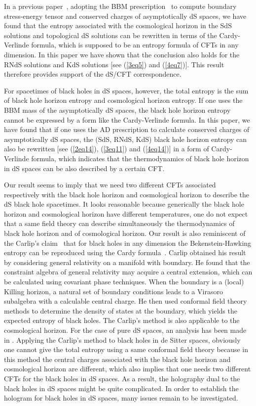 \documentclass[a4paper,12pt]{article}
\begin{document}
In a previous paper~\cite{Cai1}, adopting the BBM prescription~\cite{BBM} to compute 
boundary stress-energy tensor and conserved charges of asymptotically dS spaces, we have found
that the entropy associated with the cosmological horizon in the SdS solutions and topological 
dS solutions can be rewritten in terms of the Cardy-Verlinde formula, which is supposed
 to be an entropy formula of CFTs in any dimension. In this paper we have shown that
the conclusion also holds for the RNdS solutions and KdS solutions [see (\ref{3eq5}) and
(\ref{4eq7})].  This result therefore provides support of the dS/CFT correspondence.   

For spacetimes of black holes in dS spaces, however, the total entropy is the sum of black
hole horizon entropy and cosmological horizon entropy. If one uses the BBM mass of
the asymptotically dS spaces, the black hole horizon entropy cannot be expressed by a form
like the Cardy-Verlinde formula.  In this paper, we have found that if one uses the AD
prescription to calculate conserved charges of asymptotically dS spaces, the (SdS, RNdS, KdS)
black hole horizon entropy can also be rewritten [see (\ref{2eq14}), (\ref{3eq11}) and
(\ref{4eq14})] in a form of Cardy-Verlinde formula, which
indicates that the thermodynamics of black hole horizon in dS spaces can be also described by a
certain CFT.  
 
Our result seems to imply that we need two different CFTs associated respectively with the
black hole horizon and cosmological horizon to describe the dS black hole spacetimes. It looks
reasonable because generically the black hole horizon and cosmological horizon have different
temperatures, one do not expect that a same field theory can describe simultaneously the
thermodynamics of black hole horizon and of cosmological horizon. Our result is also 
reminiscent of the Carlip's claim~\cite{Carlip} that for black holes in any dimension the 
Bekenstein-Hawking entropy can be reproduced using the Cardy formula~\cite{Cardy}.  Carlip
obtained his result by considering general relativity on a manifold with boundary. He found
that the constraint algebra of general relativity may acquire a central extension, which can be 
calculated using covariant phase techniques. When the boundary is a (local) Killing horizon, a 
natural set of boundary conditions leads to a Virasoro subalgebra with a calculable central
charge. He then used conformal field theory methods to determine the density of states at the
boundary, which yields the expected entropy of black holes. The Carlip's method is also
applicable to the cosmological horizon. For the case of pure dS spaces, an analysis has been
made in \cite{LWu}. Applying the Carlip's method to black holes in de Sitter spaces,  obviously 
one  cannot give the total entropy using a same conformal field theory because in this method
the central charges associated with the black hole horizon and cosmological horizon are 
different, which also implies that one needs two different CFTs for the  black holes in
dS spaces.  As a result, the holography dual to the black holes in dS spaces might be
quite complicated. In order to establish the hologram for black holes in dS spaces, many
issues remain to be investigated.  
 
\end{document}
